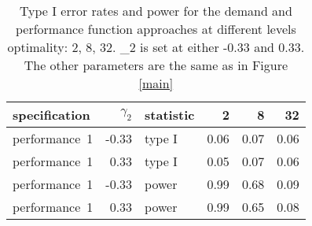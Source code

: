 \begin{table}[ht]
\centering
\begingroup\footnotesize
\begin{tabular}{lrlrrr}
  \hline
specification & $\gamma_2$ & statistic & 2 & 8 & 32 \\ 
  \hline
performance~1 & -0.33 & type I & 0.06 & 0.07 & 0.06 \\ 
  performance~1 & 0.33 & type I & 0.05 & 0.07 & 0.06 \\ 
  performance~1 & -0.33 & power & 0.99 & 0.68 & 0.09 \\ 
  performance~1 & 0.33 & power & 0.99 & 0.65 & 0.08 \\ 
   \hline
\end{tabular}
\endgroup
\caption{Type I error rates and power for the demand and 
  performance function approaches at different levels optimality: 
  2, 8, 32. \gamma_2 is set at either -0.33 and 0.33. The other 
  parameters are the same as in Figure \ref{main}} 
\label{bootstrap-table}
\end{table}

